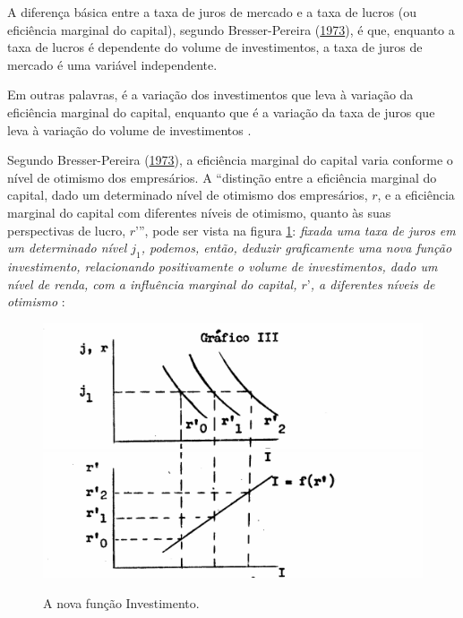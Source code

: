 \documentclass[
	12pt,				%
	oneside,			%
	a4paper,			%
	chapter=TITLE,		%
	section=TITLE,		%
	english,			%
	brazil				%
	]{abntex2}
\begin{document}
A diferença básica entre a taxa de juros de mercado e a taxa de lucros (ou
eficiência marginal do capital), segundo Bresser-Pereira (\protect\hyperlink{ref-Bresser-Pereira1973}{1973}), é que, enquanto a
taxa de lucros é dependente do volume de investimentos, a taxa de juros de
mercado é uma variável independente.
\begin{citacao}
Em outras palavras, é a variação dos investimentos que leva à variação da
eficiência marginal do capital, enquanto que é a variação da taxa de juros que
leva à variação do volume de investimentos
\cite{Bresser-Pereira1973}.
\end{citacao}
Segundo Bresser-Pereira (\protect\hyperlink{ref-Bresser-Pereira1973}{1973}), a eficiência marginal do capital
varia conforme o nível de otimismo dos empresários. A ``distinção entre a
eficiência marginal do capital, dado um determinado nível de otimismo dos
empresários, \(r\), e a eficiência marginal do capital com diferentes níveis de
otimismo, quanto às suas perspectivas de lucro, \(r’\)'', pode ser vista na
figura \ref{fig:eficienciamarginal2}: \textit{fixada uma taxa de juros em um
determinado nível $j_1$, podemos, então, deduzir graficamente uma nova função
investimento, relacionando positivamente o volume de investimentos, dado um
nível de renda, com a influência marginal do capital, $r’$, a diferentes níveis de
otimismo} \cite[p.~8]{Bresser-Pereira1973}:
\begin{figure}[h]
\begin{center}
\includegraphics[width=.8\textwidth]{images/Page-8-Image-3.png}
\includegraphics[width=.8\textwidth]{images/Page-8-Image-4.png}
\end{center}
\caption{A nova função Investimento.}
\label{fig:eficienciamarginal2}
\end{figure}
\end{document}
